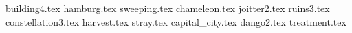 \documentclass[11pt,a4paper,oneside,arabic,korean]{article}
\begin{document}
	


	{building4.tex}
	{hamburg.tex}
	{sweeping.tex}
	{chameleon.tex}
	{joitter2.tex}
	{ruins3.tex}
	{constellation3.tex}
	{harvest.tex}
	{stray.tex}
	{capital_city.tex}
	{dango2.tex}
	{treatment.tex}
	
	
\end{document}
